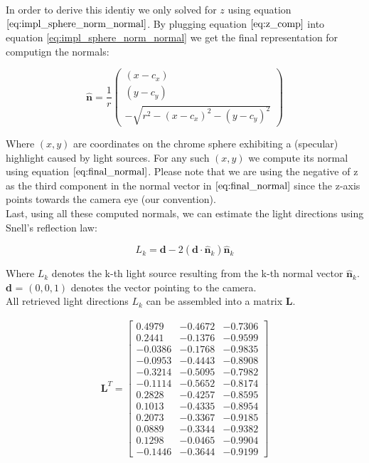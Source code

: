 \documentclass{paper}
\begin{document}
\begin{itemize}
In order to derive this identiy we only solved for $z$ using equation $\ref{eq:impl_sphere_norm_normal}$. By plugging equation $\ref{eq:z_comp}$ into equation \ref{eq:impl_sphere_norm_normal} we get the final representation for computign the normals:

\begin{equation}
    \hat{\textbf{n}} = 
    \frac{1}{r}\left(
        \begin{array}{c}
            (x-c_{x}) \\
            (y-c_{y}) \\
            -\sqrt{r^2 - (x-c_x)^2 - (y-c_y)^2}
        \end{array}
    \right)
\label{eq:final_normal}
\end{equation}

Where $(x,y)$ are coordinates on the chrome sphere exhibiting a (specular) highlight caused by light sources. For any such $(x,y)$ we compute its normal using equation $\ref{eq:final_normal}$. Please note that we are using the negative of z as the third component in the normal vector in $\ref{eq:final_normal}$ since the z-axis points towards the camera eye (our convention).  \\

Last, using all these computed normals, we can estimate the light directions using Snell's reflection law:

\begin{equation}
    L_k = \textbf{d}-2(\textbf{d}\cdot \hat{\textbf{n}}_k)\hat{\textbf{n}}_k
\label{eq:snell_reflection}
\end{equation}

Where $L_k$ denotes the k-th light source resulting from the k-th normal vector $\hat{\textbf{n}}_k$.  \textbf{d} = $(0,0,1)$ denotes the vector pointing to the camera.\\

All retrieved light directions $L_k$ can be assembled into a matrix $\mathbf{L}$. 

\begin{align}
\mathbf{L}^T= \left[ \begin{array}{ccc}
    0.4979 &  -0.4672 &  -0.7306 \\
    0.2441 &  -0.1376 &  -0.9599 \\
   -0.0386 &  -0.1768 &  -0.9835 \\
   -0.0953 &  -0.4443 &  -0.8908 \\
   -0.3214 &  -0.5095 &  -0.7982 \\
   -0.1114 &  -0.5652 &  -0.8174 \\
    0.2828 &  -0.4257 &  -0.8595 \\
    0.1013 &  -0.4335 &  -0.8954 \\
    0.2073 &  -0.3367 &  -0.9185 \\
    0.0889 &  -0.3344 &  -0.9382 \\
    0.1298 &  -0.0465 &  -0.9904 \\
   -0.1446 &  -0.3644 &  -0.9199
\end{array} \right] \nonumber
\end{align}
\end{itemize}
\end{document}
